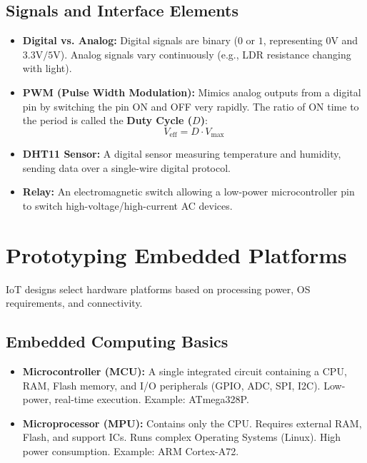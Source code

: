\documentclass[12pt,a4paper]{article}
\begin{document}
\subsection{Signals and Interface Elements}
\begin{itemize}[leftmargin=*, itemsep=3.5pt]
  \item \textbf{Digital vs. Analog:} Digital signals are binary ($0$ or $1$, representing $0\text{V}$ and $3.3\text{V}/5\text{V}$). Analog signals vary continuously (e.g., LDR resistance changing with light).
  \item \textbf{PWM (Pulse Width Modulation):} Mimics analog outputs from a digital pin by switching the pin ON and OFF very rapidly. The ratio of ON time to the period is called the \textbf{Duty Cycle ($D$)}:
        \begin{equation}
          V_{\text{eff}} = D \cdot V_{\text{max}}
        \end{equation}
  \item \textbf{DHT11 Sensor:} A digital sensor measuring temperature and humidity, sending data over a single-wire digital protocol.
  \item \textbf{Relay:} An electromagnetic switch allowing a low-power microcontroller pin to switch high-voltage/high-current AC devices.
\end{itemize}

\section{Prototyping Embedded Platforms}

IoT designs select hardware platforms based on processing power, OS requirements, and connectivity.

\subsection{Embedded Computing Basics}
\begin{itemize}[leftmargin=*, itemsep=3pt]
  \item \textbf{Microcontroller (MCU):} A single integrated circuit containing a CPU, RAM, Flash memory, and I/O peripherals (GPIO, ADC, SPI, I2C). Low-power, real-time execution. Example: ATmega328P.
  \item \textbf{Microprocessor (MPU):} Contains only the CPU. Requires external RAM, Flash, and support ICs. Runs complex Operating Systems (Linux). High power consumption. Example: ARM Cortex-A72.
\end{itemize}
\end{document}
